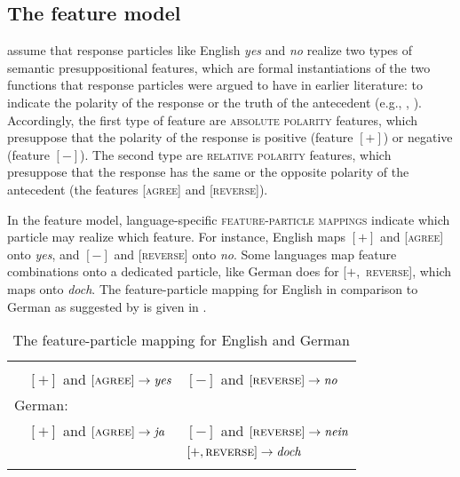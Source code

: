 \documentclass[output=paper,colorlinks,citecolor=brown]{langscibook}
\begin{document}
\subsection{The feature model}\label{geist-rep:sec:The-feature-model}

\citet{RoelofsenFarkas2015} assume that response particles like English \textit{yes} and \textit{no} realize two types of semantic presuppositional features, which are formal instantiations of the two functions that response particles were argued to have in earlier literature: to indicate the polarity of the response or the truth of the antecedent (e.g., \citealt{Pope1976}, \citealt{Jones1999}). Accordingly, the first type of feature are \textsc{absolute polarity} features, which presuppose that the polarity of the response is positive (feature $[+]$) or negative (feature $[-]$). The second type are \textsc{relative polarity} features, which presuppose that the response has the same or the opposite polarity of the antecedent (the features [\textsc{agree}] and [\textsc{reverse}]). 

In the feature model, language-specific \textsc{feature-particle mappings} indicate which particle may realize which feature. For instance, English maps $[+]$ and [\textsc{agree}] onto \textit{yes}, and $[-]$ and [\textsc{reverse}] onto \textit{no}. Some languages map feature combinations onto a dedicated particle, like German does for [$+$,~\textsc{reverse}], which maps onto \textit{doch}. The feature-particle mapping for English in comparison to German as suggested by \citet{RoelofsenFarkas2015} is given in .

\begin{table}
\caption{The feature-particle mapping for English and German}
\label{geist-repp:tab:agree-reverse-EN-DE}
 \begin{tabularx}{.8\textwidth}{lXX}
  \lsptoprule
  \multicolumn{2}{l}{English:}\\
  &$[+]$ and $[\textsc{agree}]\rightarrow\textit{yes}$ & $[-]$ and $[\textsc{reverse}]\rightarrow\textit{no}$\\
  \multicolumn{2}{l}{German:}\\
  &$[+]$ and $[\textsc{agree}]\rightarrow\textit{ja}$ & $[-]$ and $[\textsc{reverse}]\rightarrow\textit{nein}$\\
  && $[+,\textsc{reverse}]\rightarrow\textit{doch}$\\
  \lspbottomrule
 \end{tabularx}
\end{table}
\end{document}
